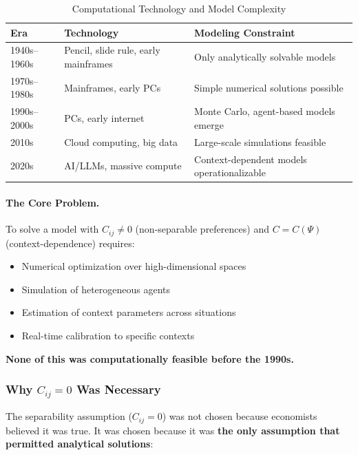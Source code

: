 \begin{table}[htbp]
\centering
\caption{Computational Technology and Model Complexity}
\label{tab:tech-constraints}
\renewcommand{\arraystretch}{1.3}
\small
\begin{tabular}{@{}lll@{}}
\toprule
\textbf{Era} & \textbf{Technology} & \textbf{Modeling Constraint} \\
\midrule
1940s--1960s & Pencil, slide rule, early mainframes &
    Only analytically solvable models \\
1970s--1980s & Mainframes, early PCs &
    Simple numerical solutions possible \\
1990s--2000s & PCs, early internet &
    Monte Carlo, agent-based models emerge \\
2010s & Cloud computing, big data &
    Large-scale simulations feasible \\
2020s & AI/LLMs, massive compute &
    Context-dependent models operationalizable \\
\bottomrule
\end{tabular}
\end{table}

\paragraph{The Core Problem.}
To solve a model with $C_{ij} \neq 0$ (non-separable preferences) and
$C = C(\Psi)$ (context-dependence) requires:
\begin{itemize}[nosep]
    \item Numerical optimization over high-dimensional spaces
    \item Simulation of heterogeneous agents
    \item Estimation of context parameters across situations
    \item Real-time calibration to specific contexts
\end{itemize}

\textbf{None of this was computationally feasible before the 1990s.}

\subsubsection{Why $C_{ij} = 0$ Was Necessary}

The separability assumption ($C_{ij} = 0$) was not chosen because economists
believed it was true. It was chosen because it was \textbf{the only assumption
that permitted analytical solutions}:

